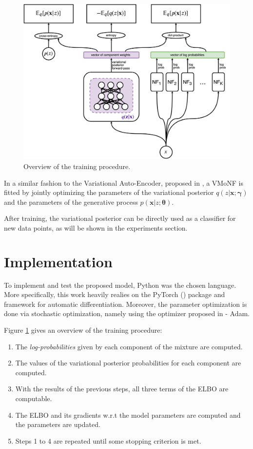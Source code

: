 \begin{figure}[!htb]
  \centering
  \includegraphics[width=0.85\linewidth]{figures/train_overview.png}
  \caption{Overview of the training procedure.}
  \label{fig:modeloverview}
\end{figure}

In a similar fashion to the Variational Auto-Encoder, proposed in \autocite{vaepaper},
a VMoNF is fitted by jointly optimizing the parameters of the variational
posterior $q(z|\bm{x}; \bm\gamma)$ and the parameters of the generative process
$p(\bm{x}|z; \bm\theta)$.

After training, the variational posterior can be directly used as a classifier
for new data points, as will be shown in the experiments section.

\section{Implementation}

To implement and test the proposed model, Python was the chosen language. More
specifically, this work heavily realies on the PyTorch (\cite{pytorch}) package
and framework for automatic differentiation. Moreover, the parameter optimization
is done via stochastic optimization, namely using the optimizer proposed in
\cite{adam} - Adam.

Figure \ref{fig:modeloverview} gives an overview of the training procedure:
\begin{enumerate}
    \item The \emph{log-probabilities} given by each component of the mixture
    are computed.
    \item The values of the variational posterior probabilities for each
    component are computed.
    \item With the results of the previous steps, all three terms of the ELBO
    are computable.
    \item The ELBO and its gradients w.r.t the model parameters are computed
    and the parameters are updated.
    \item Steps 1 to 4 are repeated until some stopping criterion is met.
\end{enumerate}

